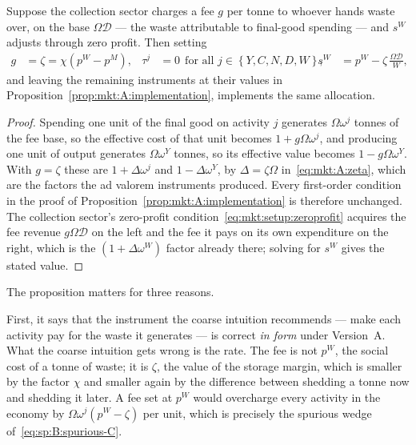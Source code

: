 \begin{proposition}\label{prop:mkt:A:gate}
Suppose the collection sector charges a fee $g$ per tonne to whoever hands waste over, on the base
$\Omega\mathcal D$ --- the waste attributable to final-good spending --- and $s^W$ adjusts through
zero profit. Then setting
\begin{align}
g &= \zeta = \chi\left(p^W-p^M\right),
&
\tau^j &= 0\ \ \text{for all } j\in\left\{Y,C,N,D,W\right\},
&
s^W &= p^W-\zeta\,\frac{\Omega\mathcal D}{W},
\label{eq:mkt:A:gate}
\end{align}
and leaving the remaining instruments at their values in
Proposition~\ref{prop:mkt:A:implementation}, implements the same allocation.
\end{proposition}

\begin{proof}
Spending one unit of the final good on activity $j$ generates $\Omega\omega^j$ tonnes of the fee base,
so the effective cost of that unit becomes $1+g\Omega\omega^j$, and producing one unit of output
generates $\Omega\omega^Y$ tonnes, so its effective value becomes $1-g\Omega\omega^Y$. With $g=\zeta$
these are $1+\Delta\omega^j$ and $1-\Delta\omega^Y$, by $\Delta=\zeta\Omega$
in~\eqref{eq:mkt:A:zeta}, which are the factors the ad valorem instruments produced. Every first-order
condition in the proof of Proposition~\ref{prop:mkt:A:implementation} is therefore unchanged. The
collection sector's zero-profit condition~\eqref{eq:mkt:setup:zeroprofit} acquires the fee revenue
$g\Omega\mathcal D$ on the left and the fee it pays on its own expenditure on the right, which is the
$\left(1+\Delta\omega^W\right)$ factor already there; solving for $s^W$ gives the stated value.
\end{proof}

The proposition matters for three reasons.

First, it says that the instrument the coarse intuition recommends --- make each activity pay for the
waste it generates --- is correct \emph{in form} under Version~A. What the coarse intuition gets wrong
is the rate. The fee is not $p^W$, the social cost of a tonne of waste; it is $\zeta$, the value of the
storage margin, which is smaller by the factor $\chi$ and smaller again by the difference between
shedding a tonne now and shedding it later. A fee set at $p^W$ would overcharge every activity in the
economy by $\Omega\omega^j\left(p^W-\zeta\right)$ per unit, which is precisely the spurious wedge
of~\eqref{eq:sp:B:spurious-C}.

